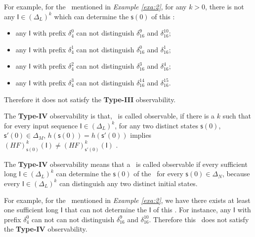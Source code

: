 \begin{example}
For example, for the \BCN\ mentioned in {\em Example \ref{exa:2}}, for any $k>0$, there is not any $\mathsf{I}\in(\Delta_L)^k$ which can determine the $\mathsf{s}(0)$ of this \BCN:
\begin{itemize}
  \item any $\mathsf{I}$ with prefix $\delta_{4}^0$ can not distinguish $\delta_{16}^9$ and $\delta_{16}^{10}$;
  \item any $\mathsf{I}$ with prefix $\delta_{4}^1$ can not distinguish $\delta_{16}^0$ and $\delta_{16}^{1}$;
  \item any $\mathsf{I}$ with prefix $\delta_{4}^2$ can not distinguish $\delta_{16}^3$ and $\delta_{16}^{4}$;
  \item any $\mathsf{I}$ with prefix $\delta_{4}^3$ can not distinguish $\delta_{16}^{14}$ and $\delta_{16}^{15}$.
\end{itemize} 
Therefore it does not satisfy the {\bf Type-III} observability. 
\label{exa:6}
\end{example}  
\begin{definition}
	The {\bf Type-IV} observability is that, \BCN\ is called observable, if there is a $k$ such that for every input sequence $\mathsf{I}\in(\Delta_L)^{k}$, for any two distinct states $\mathsf{s}(0)$, $\mathsf{s}'(0) \in \Delta_M$, $h(\mathsf{s}(0))=h(\mathsf{s}'(0))$ implies $(HF)^{k}_{\mathsf{s}(0)}(\mathsf{I})\neq (HF)^{k}_{\mathsf{s}'(0)}(\mathsf{I})$ \cite{Fornasini2013Observability}.
\end{definition}

The {\bf Type-IV} observability means that a \BCN\ is called observable if every sufficient long $\mathsf{I}\in(\Delta_L)^{k}$ can determine the $\mathsf{s}(0)$ of the \BCN\ for every $\mathsf{s}(0)\in\Delta_N$, because every $\mathsf{I}\in(\Delta_L)^{k}$ can distinguish any two distinct initial states.%
\begin{example}
For example, for the \BCN\ mentioned in {\em Example \ref{exa:2}}, we have there exists at least one sufficient long $\mathsf{I}$ that can not determine the $\mathsf{I}$ of this \BCN. For instance, any $\mathsf{I}$ with prefix $\delta_{4}^0$ can not can not distinguish $\delta_{16}^9$ and $\delta_{16}^{10}$. 
Therefore this \BCN\ does not satisfy the {\bf Type-IV} observability. 
\label{exa:7}
\end{example}  

